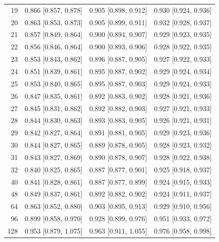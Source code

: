 \begin{longtable}{rccc}
19 & 0.866 [0.857, 0.878] & 0.905 [0.898, 0.912] & 0.930 [0.924, 0.936] \\
20 & 0.863 [0.853, 0.873] & 0.905 [0.899, 0.911] & 0.932 [0.928, 0.937] \\
21 & 0.857 [0.849, 0.864] & 0.900 [0.894, 0.907] & 0.929 [0.923, 0.935] \\
22 & 0.856 [0.846, 0.864] & 0.900 [0.893, 0.906] & 0.928 [0.922, 0.935] \\
23 & 0.853 [0.843, 0.862] & 0.896 [0.887, 0.905] & 0.927 [0.922, 0.933] \\
24 & 0.851 [0.839, 0.861] & 0.895 [0.887, 0.902] & 0.929 [0.924, 0.934] \\
25 & 0.853 [0.840, 0.865] & 0.895 [0.887, 0.903] & 0.929 [0.924, 0.933] \\
26 & 0.847 [0.835, 0.861] & 0.892 [0.883, 0.902] & 0.928 [0.921, 0.936] \\
27 & 0.845 [0.831, 0.862] & 0.892 [0.882, 0.903] & 0.927 [0.921, 0.933] \\
28 & 0.844 [0.830, 0.863] & 0.893 [0.883, 0.905] & 0.926 [0.921, 0.931] \\
29 & 0.842 [0.827, 0.864] & 0.891 [0.881, 0.905] & 0.929 [0.923, 0.936] \\
30 & 0.844 [0.827, 0.865] & 0.889 [0.878, 0.905] & 0.928 [0.923, 0.932] \\
31 & 0.843 [0.827, 0.869] & 0.890 [0.878, 0.907] & 0.928 [0.922, 0.938] \\
32 & 0.840 [0.825, 0.865] & 0.887 [0.877, 0.901] & 0.925 [0.918, 0.937] \\
40 & 0.841 [0.828, 0.861] & 0.887 [0.877, 0.899] & 0.924 [0.915, 0.933] \\
48 & 0.849 [0.837, 0.861] & 0.892 [0.882, 0.902] & 0.924 [0.911, 0.937] \\
64 & 0.863 [0.852, 0.880] & 0.903 [0.895, 0.913] & 0.929 [0.910, 0.956] \\
96 & 0.899 [0.858, 0.970] & 0.928 [0.899, 0.976] & 0.951 [0.933, 0.972] \\
128 & 0.953 [0.879, 1.075] & 0.963 [0.911, 1.055] & 0.976 [0.958, 0.998] \\
\end{longtable}

